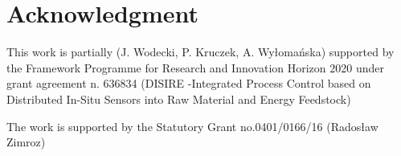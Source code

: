 \documentclass[conference]{IEEEtran}
\begin{document}


\section*{Acknowledgment}
This work is partially (J. Wodecki, P. Kruczek, A. Wy{\l}oma{\'n}ska) supported by the Framework Programme for Research and Innovation Horizon 2020 under grant agreement n. 636834 (DISIRE -Integrated Process Control based on Distributed In-Situ Sensors into Raw Material and Energy Feedstock) 

The work is supported by the Statutory Grant no.0401/0166/16 (Rados{\l}aw Zimroz)







\end{document}
